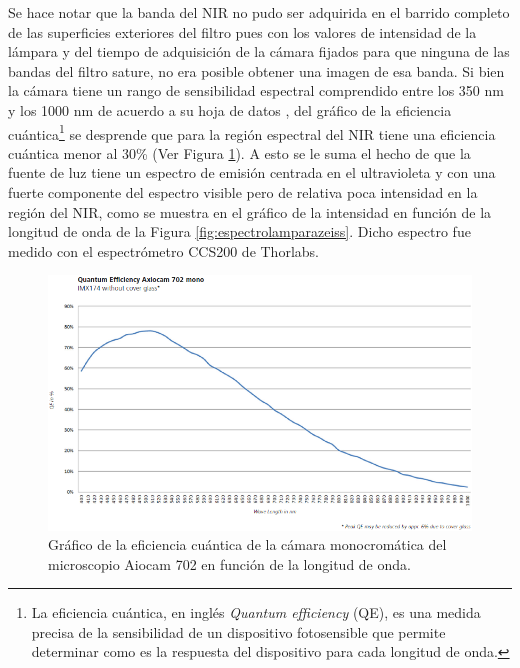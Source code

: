 Se hace notar que la banda del NIR no pudo ser adquirida en el barrido completo de las superficies exteriores del filtro pues con los valores de intensidad de la lámpara y del tiempo de adquisición de la cámara fijados para que ninguna de las bandas del filtro sature, no era posible obtener una imagen de esa banda. Si bien la cámara tiene un rango de sensibilidad espectral comprendido entre los 350 nm y los 1000 nm de acuerdo a su hoja de datos \cite{axiozeiss}, del gráfico de la eficiencia cuántica\footnote{La eficiencia cuántica, en inglés \textit{Quantum efficiency} (QE), es una medida precisa de la sensibilidad de un dispositivo fotosensible que permite determinar como es la respuesta del dispositivo para cada longitud de onda.} se desprende que para la región espectral del NIR tiene una eficiencia cuántica menor al 30\% (Ver Figura \ref{fig:eficienciacuanticamara}). A esto se le suma el hecho de que la fuente de luz tiene un espectro de emisión centrada en el ultravioleta y con una fuerte componente del espectro visible pero de relativa poca intensidad en la región del NIR, como se muestra en el gráfico de la intensidad en función de la longitud de onda de la Figura \ref{fig:espectrolamparazeiss}. Dicho espectro fue medido con el espectrómetro CCS200 de Thorlabs. 
\begin{figure}[H]
	\centering
	\includegraphics[width=1.0\textwidth]{Figs/defectosZEISS/eficienciacuanticacamarazeiss.png}
	\caption{Gráfico de la eficiencia cuántica de la cámara monocromática del microscopio Aiocam 702 en función de la longitud de onda.}
	\label{fig:eficienciacuanticamara}
\end{figure}
